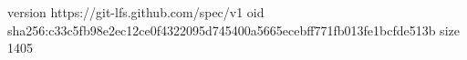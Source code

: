 version https://git-lfs.github.com/spec/v1
oid sha256:c33c5fb98e2ec12ce0f4322095d745400a5665ecebff771fb013fe1bcfde513b
size 1405
